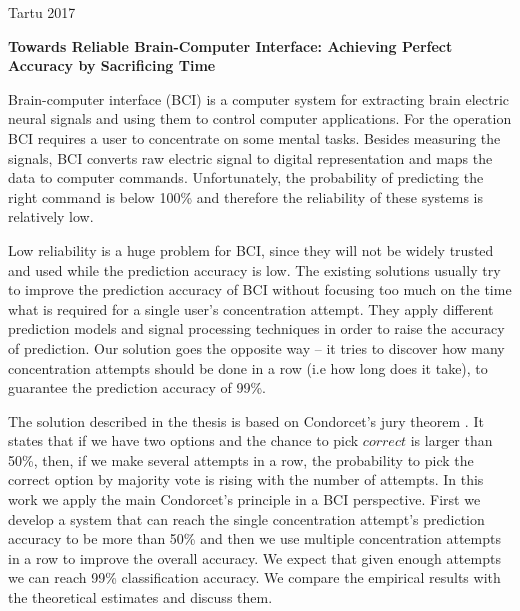 \documentclass[12pt]{article}
\theoremstyle{definition}
\begin{document}
\vspace{8mm}


\vfill
\centerline{Tartu 2017}



\newpage
{}
\noindent\textbf{\large Towards Reliable Brain-Computer Interface: Achieving Perfect Accuracy by Sacrificing Time}
\vspace*{2ex}
{ }

Brain-computer interface (BCI) is a computer system for extracting brain electric neural signals and using them to control computer applications. For the operation BCI requires a user to concentrate on some mental tasks. Besides measuring the signals, BCI converts raw electric signal to digital representation  and maps the data to computer commands. Unfortunately, the probability of predicting the right command is below 100\% and therefore the reliability of these systems is relatively low.

Low reliability is a huge problem for BCI, since they will not be widely trusted and used while the prediction accuracy is low. The existing solutions usually try to improve the prediction accuracy of BCI without focusing too much on the time what is required for a single user's concentration attempt. They apply different prediction models and signal processing techniques in order to raise the accuracy of prediction. Our solution goes the opposite way -- it tries to discover how many concentration attempts should be done in a row (i.e how long does it take), to guarantee the prediction accuracy of 99\%.

The solution described in the thesis is based on Condorcet's jury theorem \cite{condorcets}. It states that if we have two options and the chance to pick $correct$ is larger than 50\%, then, if we make several attempts in a row, the probability to pick the correct option by majority vote is rising with the number of attempts. In this work we apply the main Condorcet's principle in a BCI perspective. First we develop a system that can reach the single concentration attempt's prediction accuracy to be more than 50\% and then we use multiple concentration attempts in a row to improve the overall accuracy. We expect that given enough attempts we can reach 99\% classification accuracy. We compare the empirical results with the theoretical estimates and discuss them.
\end{document}
